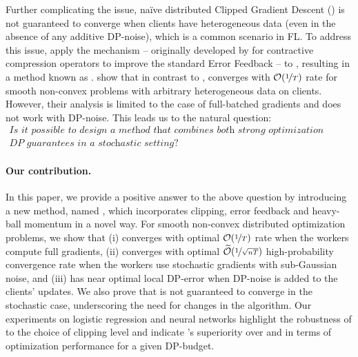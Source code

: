 \documentclass[a4paper,11pt]{article}
\begin{document}
Further complicating the issue, na\"ive distributed Clipped Gradient Descent () is not guaranteed to converge \citep{khirirat2023clip21} when clients have heterogeneous data (even in the absence of any additive DP-noise), which is a common scenario in FL. To address this issue, \citet{khirirat2023clip21} apply the  mechanism -- originally developed by \citet{richtarik2021ef21} for contractive compression operators to improve the standard Error Feedback \citep{seide20141} -- to , resulting in a method known as . \citet{khirirat2023clip21} show that in contrast to ,  converges with $\mathcal O(\nicefrac{1}{T})$ rate for smooth non-convex problems with arbitrary heterogeneous data on clients. However, their analysis is limited to the case of full-batched gradients and does not work with DP-noise. This leads us to the natural question:
\begin{gather*}
    \textit{Is it possible to design a method that combines both strong optimization performance and }\\
    \textit{DP guarantees in a stochastic setting?}%
\end{gather*}


\paragraph{Our contribution.} In this paper, we provide a positive answer to the above question by introducing a new method, named , which incorporates clipping, error feedback and heavy-ball momentum \citep{polyak1964some} in a novel way. For smooth non-convex distributed optimization problems, we show that  (i) converges with optimal $\mathcal O(\nicefrac{1}{T})$ rate when the workers compute full gradients, (ii) converges with optimal $\widetilde{\mathcal O}(\nicefrac{1}{\sqrt{nT}})$ high-probability convergence rate when the workers use stochastic gradients with sub-Gaussian noise, and (iii) has near optimal local DP-error when DP-noise is added to the clients' updates. We also prove that  is not guaranteed to converge in the stochastic case, underscoring the need for changes in the algorithm. Our experiments on logistic regression and neural networks highlight the robustness of  to the choice of clipping level and indicate 's superiority over  and  in terms of optimization performance for a given DP-budget.
\end{document}

